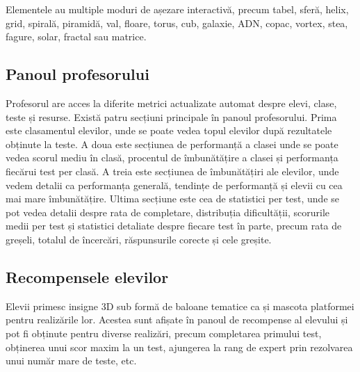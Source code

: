 Elementele au multiple moduri de așezare interactivă, precum tabel, sferă, helix, grid, 
spirală, piramidă, val, floare, torus, cub, galaxie, ADN, copac, vortex, stea, fagure, solar,
fractal sau matrice.

\subsection{Panoul profesorului}
\label{subsec:panou-profesor}

Profesorul are acces la diferite metrici actualizate automat despre elevi, clase, teste și resurse.
Există patru secțiuni principale în panoul profesorului. Prima este clasamentul elevilor, unde se 
poate vedea topul elevilor după rezultatele obținute la teste. A doua este secțiunea de performanță
a clasei unde se poate vedea scorul mediu în clasă, procentul de îmbunătățire a clasei și
performanța fiecărui test per clasă. A treia este secțiunea de îmbunătățiri ale elevilor, unde
vedem detalii ca performanța generală, tendințe de performanță și elevii cu cea mai mare îmbunătățire.
Ultima secțiune este cea de statistici per test, unde se pot vedea detalii despre rata de completare,
distribuția dificultății, scorurile medii per test și statistici detaliate despre fiecare test în parte, precum
rata de greșeli, totalul de încercări, răspunsurile corecte și cele greșite.


\subsection{Recompensele elevilor}
\label{subsec:recompense-elevi}

Elevii primesc insigne 3D sub formă de baloane tematice ca și mascota platformei pentru realizările lor.
Acestea sunt afișate în panoul de recompense al elevului și pot fi obținute pentru diverse realizări, precum
completarea primului test, obținerea unui scor maxim la un test, ajungerea la rang de expert prin rezolvarea
unui număr mare de teste, etc.